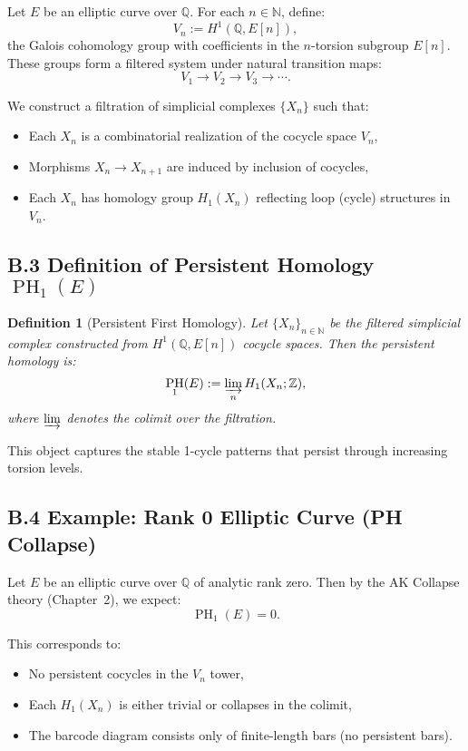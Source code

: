 \documentclass[11pt]{article}
\newtheorem{definition}[theorem]{Definition}
\DeclareMathOperator{\PH}{PH}
\newcommand{\QQ}{\mathbb{Q}}
\newcommand{\ZZ}{\mathbb{Z}}
\begin{document}
Let $E$ be an elliptic curve over $\QQ$. For each $n \in \mathbb{N}$, define:
\[
V_n := H^1(\QQ, E[n]),
\]
the Galois cohomology group with coefficients in the $n$-torsion subgroup $E[n]$. These groups form a filtered system under natural transition maps:
\[
V_1 \to V_2 \to V_3 \to \cdots.
\]

We construct a filtration of simplicial complexes $\{X_n\}$ such that:
\begin{itemize}
  \item Each $X_n$ is a combinatorial realization of the cocycle space $V_n$,
  \item Morphisms $X_n \to X_{n+1}$ are induced by inclusion of cocycles,
  \item Each $X_n$ has homology group $H_1(X_n)$ reflecting loop (cycle) structures in $V_n$.
\end{itemize}

\subsection*{B.3 Definition of Persistent Homology $\PH_1(E)$}

\begin{definition}[Persistent First Homology]
Let $\{X_n\}_{n\in\mathbb{N}}$ be the filtered simplicial complex constructed from $H^1(\QQ, E[n])$ cocycle spaces.  
Then the persistent homology is:
\[
\PH_1(E) := \varinjlim_{n} H_1(X_n; \ZZ),
\]
where $\varinjlim$ denotes the colimit over the filtration.
\end{definition}

This object captures the stable 1-cycle patterns that persist through increasing torsion levels.

\subsection*{B.4 Example: Rank 0 Elliptic Curve (PH Collapse)}

Let $E$ be an elliptic curve over $\QQ$ of analytic rank zero.  
Then by the AK Collapse theory (Chapter~2), we expect:
\[
\PH_1(E) = 0.
\]

This corresponds to:
\begin{itemize}
  \item No persistent cocycles in the $V_n$ tower,
  \item Each $H_1(X_n)$ is either trivial or collapses in the colimit,
  \item The barcode diagram consists only of finite-length bars (no persistent bars).
\end{itemize}
\end{document}
